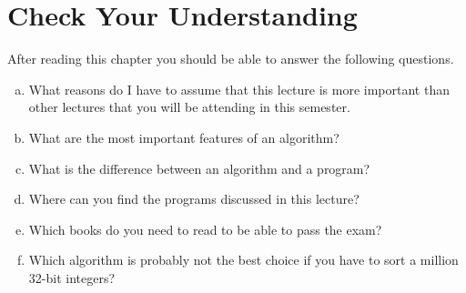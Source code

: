 \section{Check Your Understanding}
After reading this chapter you should be able to answer the following questions.
\begin{enumerate}[(a)]
\item What reasons do I have to assume that this lecture is more important than other lectures that you will be
      attending in this semester.
\item What are the most important features of an algorithm?
\item What is the difference between an algorithm and a program?
\item Where can you find the programs discussed in this lecture?
\item Which books do you need to read to be able to pass the exam?
\item Which algorithm is probably not the best choice if you have to sort a million 32-bit integers? 
\end{enumerate}

